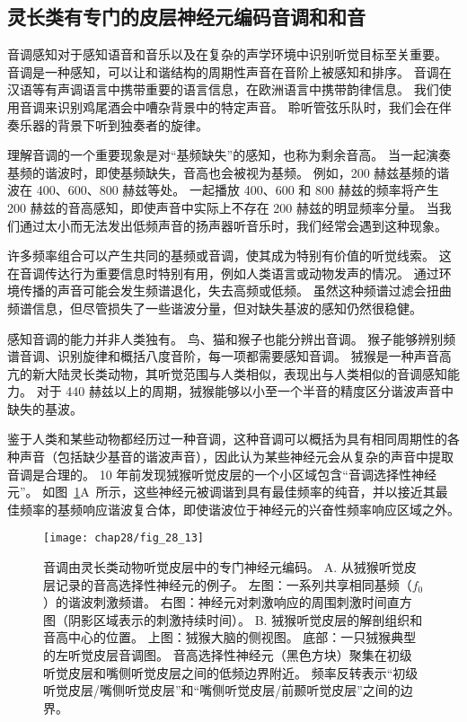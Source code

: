 \subsection{灵长类有专门的皮层神经元编码音调和和音}

音调感知对于感知语音和音乐以及在复杂的声学环境中识别听觉目标至关重要。
音调是一种感知，可以让和谐结构的周期性声音在音阶上被感知和排序。
音调在汉语等有声调语言中携带重要的语言信息，在欧洲语言中携带韵律信息。
我们使用音调来识别鸡尾酒会中嘈杂背景中的特定声音。
聆听管弦乐队时，我们会在伴奏乐器的背景下听到独奏者的旋律。


理解音调的一个重要现象是对“基频缺失”的感知，也称为剩余音高。
当一起演奏基频的谐波时，即使基频缺失，音高也会被视为基频。
例如，200 赫兹基频的谐波在 400、600、800 赫兹等处。
一起播放 400、600 和 800 赫兹的频率将产生 200 赫兹的音高感知，即使声音中实际上不存在 200 赫兹的明显频率分量。
当我们通过太小而无法发出低频声音的扬声器听音乐时，我们经常会遇到这种现象。


许多频率组合可以产生共同的基频或音调，使其成为特别有价值的听觉线索。
这在音调传达行为重要信息时特别有用，例如人类语言或动物发声的情况。
通过环境传播的声音可能会发生频谱退化，失去高频或低频。
虽然这种频谱过滤会扭曲频谱信息，但尽管损失了一些谐波分量，但对缺失基波的感知仍然很稳健。


感知音调的能力并非人类独有。
鸟、猫和猴子也能分辨出音调。
猴子能够辨别频谱音调、识别旋律和概括八度音阶，每一项都需要感知音调。
狨猴是一种声音高亢的新大陆灵长类动物，其听觉范围与人类相似，表现出与人类相似的音调感知能力。
对于 440 赫兹以上的周期，狨猴能够以小至一个半音的精度区分谐波声音中缺失的基波。


鉴于人类和某些动物都经历过一种音调，这种音调可以概括为具有相同周期性的各种声音（包括缺少基音的谐波声音），因此认为某些神经元会从复杂的声音中提取音调是合理的。
10 年前发现狨猴听觉皮层的一个小区域包含“音调选择性神经元”\cite{bendor2005neuronal}。
如图~\ref{fig:28_13}A~所示，这些神经元被调谐到具有最佳频率的纯音，并以接近其最佳频率的基频响应谐波复合体，即使谐波位于神经元的兴奋性频率响应区域之外。


\begin{figure}[htbp]
	\centering
	\texttt{[image: chap28/fig\_28\_13]}
	\caption{音调由灵长类动物听觉皮层中的专门神经元编码。
		A. 从狨猴听觉皮层记录的音高选择性神经元的例子。
		左图：一系列共享相同基频（$f_0$）的谐波刺激频谱。
		右图：神经元对刺激响应的周围刺激时间直方图（阴影区域表示的刺激持续时间）\cite{bendor2005neuronal}。
		B. 狨猴听觉皮层的解剖组织和音高中心的位置。
		上图：狨猴大脑的侧视图。
		底部：一只狨猴典型的左听觉皮层音调图。
		音高选择性神经元（黑色方块）聚集在初级听觉皮层和嘴侧听觉皮层之间的低频边界附近。
		频率反转表示“初级听觉皮层/嘴侧听觉皮层”和“嘴侧听觉皮层/前颞听觉皮层”之间的边界\cite{bendor2005neuronal}。}
	\label{fig:28_13}
\end{figure}


